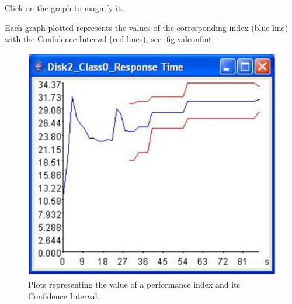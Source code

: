 Click on the graph to magnify it.

Each graph plotted represents the values of the corresponding
index (blue line) with the Confidence Interval (red lines), see
\autoref{fig:valconfint}.
\begin{figure}[htb]
    \begin{center}
        \includegraphics[scale=.5]{img/jsimg/11.2.eps}
    \end{center}
    \caption{Plots representing the value of a performance index and its
    Confidence Interval.}
    \label{fig:valconfint}
\end{figure}\\

